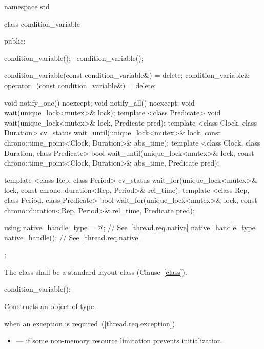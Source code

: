 \begin{codeblock}
namespace std {
  class condition_variable {
  public:

    condition_variable();
    ~condition_variable();

    condition_variable(const condition_variable&) = delete;
    condition_variable& operator=(const condition_variable&) = delete;

    void notify_one() noexcept;
    void notify_all() noexcept;
    void wait(unique_lock<mutex>& lock);
    template <class Predicate>
      void wait(unique_lock<mutex>& lock, Predicate pred);
    template <class Clock, class Duration>
      cv_status wait_until(unique_lock<mutex>& lock,
                           const chrono::time_point<Clock, Duration>& abs_time);
    template <class Clock, class Duration, class Predicate>
      bool wait_until(unique_lock<mutex>& lock,
                      const chrono::time_point<Clock, Duration>& abs_time,
                      Predicate pred);

    template <class Rep, class Period>
      cv_status wait_for(unique_lock<mutex>& lock,
                         const chrono::duration<Rep, Period>& rel_time);
    template <class Rep, class Period, class Predicate>
      bool wait_for(unique_lock<mutex>& lock,
                    const chrono::duration<Rep, Period>& rel_time,
                    Predicate pred);

    using native_handle_type = @\impdef@; // See~\ref{thread.req.native}
    native_handle_type native_handle();                // See~\ref{thread.req.native}
  };
}
\end{codeblock}

\pnum
The class  shall be a standard-layout class (Clause~\ref{class}).

%
\begin{itemdecl}
condition_variable();
\end{itemdecl}

\begin{itemdescr}
\pnum
\effects Constructs an object of type .

\pnum
\throws {} when an exception is required~(\ref{thread.req.exception}).

\pnum
\errors
\begin{itemize}
\item {} --- if some non-memory resource
limitation prevents initialization.
\end{itemize}
\end{itemdescr}

